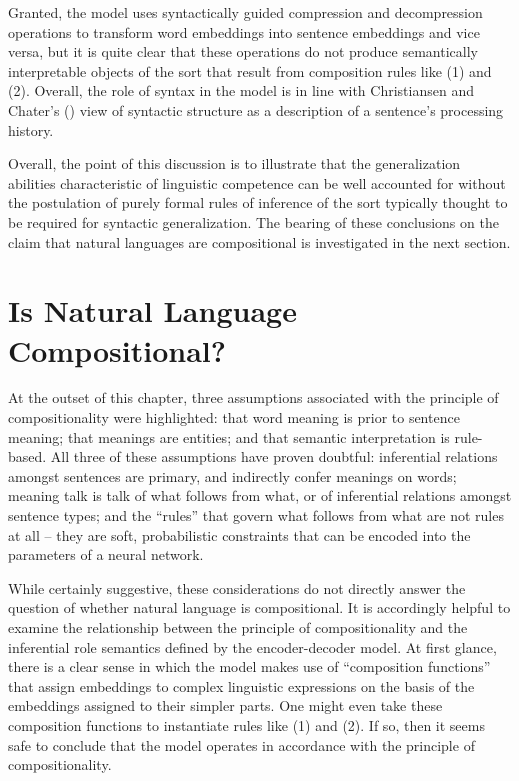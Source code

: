 Granted, the model uses syntactically guided compression and decompression operations to transform word embeddings into sentence embeddings and vice versa, but it is quite clear that these operations do not produce semantically interpretable objects of the sort that result from composition rules like (1) and (2). Overall, the role of syntax in the model is in line with Christiansen and Chater's (\citeyear{Christiansen:2015}) view of syntactic structure as a description of a sentence's processing history.


Overall, the point of this discussion is to illustrate that the generalization abilities characteristic of linguistic competence can be well accounted for without the postulation of purely formal rules of inference of the sort typically thought to be required for syntactic generalization. The bearing of these conclusions on the claim that natural languages are compositional is investigated in the next section.  

\section{Is Natural Language Compositional?}

At the outset of this chapter, three assumptions associated with the principle of compositionality were highlighted: that word meaning is prior to sentence meaning; that meanings are entities; and that semantic interpretation is rule-based. All three of these assumptions have proven doubtful: inferential relations amongst sentences are primary, and indirectly confer meanings on words; meaning talk is talk of what follows from what, or of inferential relations amongst sentence types; and the ``rules'' that govern what follows from what are not rules at all -- they are soft, probabilistic constraints that can be encoded into the parameters of a neural network. 

While certainly suggestive, these considerations do not directly answer the question of whether natural language is compositional. It is accordingly helpful to examine the relationship between the principle of compositionality and the inferential role semantics defined by the encoder-decoder model. At first glance, there is a clear sense in which the model makes use of ``composition functions'' that assign embeddings to complex linguistic expressions on the basis of the embeddings assigned to their simpler parts. One might even take these composition functions to instantiate rules like (1) and (2). If so, then it seems safe to conclude that the model operates in accordance with the principle of compositionality. 


